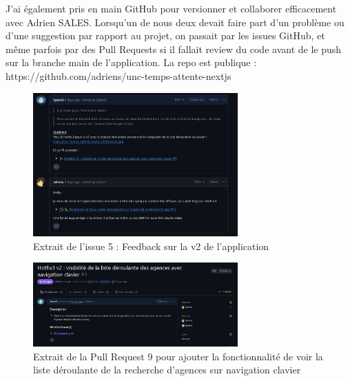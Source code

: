\documentclass[12pt,a4paper]{report}
\begin{document}
\vspace{1cm}
J’ai également pris en main GitHub pour versionner et collaborer efficacement avec Adrien SALES. Lorsqu'un de nous deux devait faire part d'un problème ou d'une suggestion par rapport au projet, on passait par les issues GitHub, et même parfois par des Pull Requests si il fallait review du code avant de le push sur la branche main de l'application. La repo est publique : https://github.com/adriens/unc-temps-attente-nextjs

\vspace{1cm}
\begin{figure}[h] %
    \centering
    \includegraphics[width=0.7\textwidth]{ressources_rapport/extrait_issue_5.JPG}
    \caption{Extrait de l'issue 5 : Feedback sur la v2 de l'application}
\end{figure}

\begin{figure}[h] %
    \centering
    \includegraphics[width=0.7\textwidth]{ressources_rapport/extrait_pr_9.JPG}
    \caption{Extrait de la Pull Request 9 pour ajouter la fonctionnalité de voir la liste déroulante de la recherche d'agences sur navigation clavier}
\end{figure}
\newpage
\end{document}
